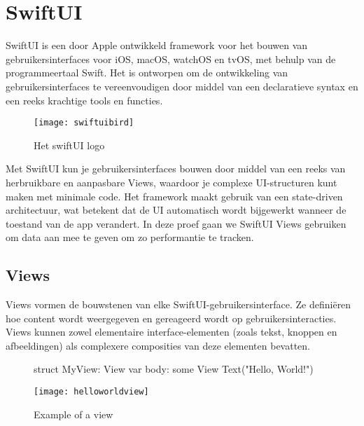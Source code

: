 \section{SwiftUI}
\autocite{AppleSwiftUI} SwiftUI is een door Apple ontwikkeld framework voor het bouwen van gebruikersinterfaces voor iOS, macOS, watchOS en tvOS, met behulp van de programmeertaal Swift. Het is ontworpen om de ontwikkeling van gebruikersinterfaces te vereenvoudigen door middel van een declaratieve syntax en een reeks krachtige tools en functies.
\begin{wrapfigure}{r}{0.3\textwidth}
    \texttt{[image: swiftuibird]} 
    \caption{Het swiftUI logo}
    \label{fig:swiftUI}
\end{wrapfigure}
Met SwiftUI kun je gebruikersinterfaces bouwen door middel van een reeks van herbruikbare en aanpasbare Views, waardoor je complexe UI-structuren kunt maken met minimale code. Het framework maakt gebruik van een state-driven architectuur, wat betekent dat de UI automatisch wordt bijgewerkt wanneer de toestand van de app verandert. In deze proef gaan we SwiftUI Views gebruiken om data aan mee te geven om zo performantie te tracken.

\subsection{Views}
\autocite{AppleSwiftViews} Views vormen de bouwstenen van elke SwiftUI-gebruikersinterface. Ze definiëren hoe content wordt weergegeven en gereageerd wordt op gebruikersinteracties. Views kunnen zowel elementaire interface-elementen (zoals tekst, knoppen en afbeeldingen) als complexere composities van deze elementen bevatten.

\begin{figure}[h]
    \begin{minipage}{0.5\textwidth}
        \begin{swift}[caption=Example of a view, label=view_example]
           struct MyView: View {
               var body: some View {
                   Text("Hello, World!")
               }
           }
        \end{swift}
    \end{minipage}%
    \hfill
    \begin{minipage}{0.45\textwidth}
        \centering
        \texttt{[image: helloworldview]}
        \caption{Example of a view}
        \label{fig:viewex1}
    \end{minipage}
\end{figure}

